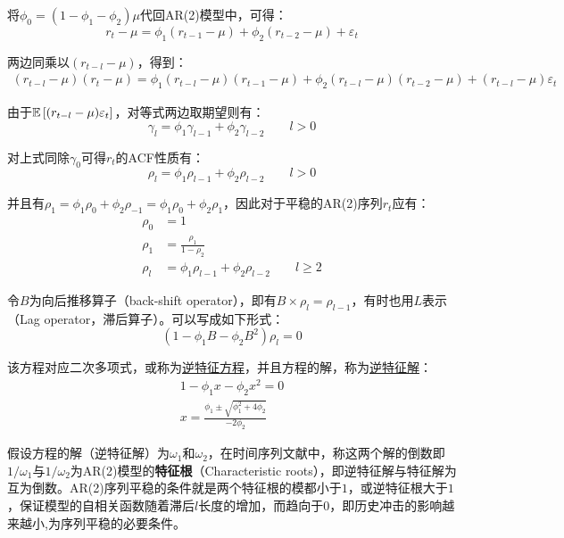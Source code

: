 \documentclass[11pt]{article}
\begin{document}
将$\phi_0 = (1-\phi_1-\phi_2)\mu$代回AR(2)模型中，可得：
\begin{equation*}
    r_t - \mu = \phi_1(r_{t-1}-\mu) + \phi_2(r_{t-2}-\mu) + \varepsilon_t
\end{equation*}

两边同乘以$(r_{t-l}-\mu)$，得到：
\begin{align*}
    (r_{t-l} - \mu)(r_t - \mu) = \phi_1 (r_{t-l}-\mu)(r_{t-1} - \mu)
    + \phi_2 (r_{t-l}-\mu)(r_{t-2} - \mu) + (r_{t-l}-\mu) \varepsilon_t
\end{align*}

由于$\mathbb{E}\left[(r_{t-l} - \mu)\varepsilon_t\right]$，对等式两边取期望则有：
\begin{equation*}
    \gamma_l = \phi_1 \gamma_{l-1} + \phi_2 \gamma_{l-2} \qquad l>0
\end{equation*}

对上式同除$\gamma_0$可得$r_t$的ACF性质有：
\begin{equation*}
    \rho_l = \phi_1 \rho_{l-1} + \phi_2 \rho_{l-2} \qquad l>0
\end{equation*}

并且有$\rho_1 = \phi_1 \rho_{0} + \phi_2 \rho_{-1} = \phi_1 \rho_{0} + \phi_2 \rho_{1} $，因此对于平稳的AR(2)序列$r_t$应有：
\begin{align*}
    \rho_0 &= 1 \\
    \rho_1 &= \frac{\rho_1}{1-\rho_2} \\
    \rho_l &= \phi_1 \rho_{l-1} + \phi_2 \rho_{l-2} \qquad l \geq 2
\end{align*}

令$B$为向后推移算子（back-shift operator），即有$B \times \rho_l = \rho_{l-1}$，有时也用$L$表示（Lag operator，滞后算子）。可以写成如下形式：
\begin{equation*}
    (1-\phi_1 B - \phi_2 B^2)\rho_l = 0
\end{equation*}

该方程对应二次多项式，或称为\uline{逆特征方程}，并且方程的解，称为\uline{逆特征解}：
\begin{gather*}
    1 - \phi_1 x - \phi_2 x^2 = 0 \\
    x = \frac{\phi_1 \pm \sqrt{\phi_{1}^{2} + 4\phi_2}}{-2\phi_2}
\end{gather*}

假设方程的解（逆特征解）为$\omega_1$和$\omega_2$，在时间序列文献中，称这两个解的倒数即$1/\omega_1$与$1/\omega_2$为AR(2)模型的\textbf{特征根}（Characteristic roots），即逆特征解与特征解为互为倒数。AR(2)序列平稳的条件就是两个特征根的模都小于$1$，或逆特征根大于$1$，保证模型的自相关函数随着滞后$l$长度的增加，而趋向于$0$，即历史冲击的影响越来越小,为序列平稳的必要条件。
\end{document}

